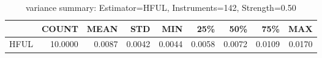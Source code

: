 \begin{table}[ht]
\centering
\caption{variance summary: Estimator=HFUL, Instruments=142, Strength=0.50}
\begin{tabular}{lrrrrrrrr}
\toprule
 & COUNT & MEAN & STD & MIN & 25\% & 50\% & 75\% & MAX \\
\midrule
HFUL & 10.0000 & 0.0087 & 0.0042 & 0.0044 & 0.0058 & 0.0072 & 0.0109 & 0.0170 \\
\bottomrule
\end{tabular}
\end{table}
